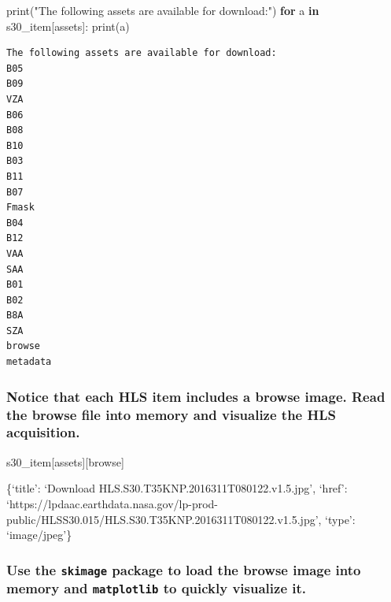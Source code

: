 \documentclass[
  letterpaper,
]{scrartcl}
\newenvironment{Shaded}{}{}
\newcommand{\BuiltInTok}[1]{#1}
\newcommand{\ControlFlowTok}[1]{\textcolor[rgb]{0.00,0.44,0.13}{\textbf{#1}}}
\newcommand{\KeywordTok}[1]{\textcolor[rgb]{0.00,0.44,0.13}{\textbf{#1}}}
\newcommand{\NormalTok}[1]{#1}
\newcommand{\StringTok}[1]{\textcolor[rgb]{0.25,0.44,0.63}{#1}}
\begin{document}
\begin{Shaded}
\begin{Highlighting}[]
\BuiltInTok{print}\NormalTok{(}\StringTok{"The following assets are available for download:"}\NormalTok{)}
\ControlFlowTok{for}\NormalTok{ a }\KeywordTok{in}\NormalTok{ s30\_item[}\StringTok{\textquotesingle{}assets\textquotesingle{}}\NormalTok{]: }\BuiltInTok{print}\NormalTok{(a)}
\end{Highlighting}
\end{Shaded}

\begin{verbatim}
The following assets are available for download:
B05
B09
VZA
B06
B08
B10
B03
B11
B07
Fmask
B04
B12
VAA
SAA
B01
B02
B8A
SZA
browse
metadata
\end{verbatim}

\hypertarget{notice-that-each-hls-item-includes-a-browse-image.-read-the-browse-file-into-memory-and-visualize-the-hls-acquisition.}{%
\subsubsection{Notice that each HLS item includes a browse image. Read
the browse file into memory and visualize the HLS
acquisition.}\label{notice-that-each-hls-item-includes-a-browse-image.-read-the-browse-file-into-memory-and-visualize-the-hls-acquisition.}}

\begin{Shaded}
\begin{Highlighting}[]
\NormalTok{s30\_item[}\StringTok{\textquotesingle{}assets\textquotesingle{}}\NormalTok{][}\StringTok{\textquotesingle{}browse\textquotesingle{}}\NormalTok{]}
\end{Highlighting}
\end{Shaded}

\{`title': `Download HLS.S30.T35KNP.2016311T080122.v1.5.jpg', `href':
`https://lpdaac.earthdata.nasa.gov/lp-prod-public/HLSS30.015/HLS.S30.T35KNP.2016311T080122.v1.5.jpg',
`type': `image/jpeg'\}

\hypertarget{use-the-skimage-package-to-load-the-browse-image-into-memory-and-matplotlib-to-quickly-visualize-it.}{%
\subsubsection{\texorpdfstring{Use the \texttt{skimage} package to load
the browse image into memory and \texttt{matplotlib} to quickly
visualize
it.}{Use the skimage package to load the browse image into memory and matplotlib to quickly visualize it.}}\label{use-the-skimage-package-to-load-the-browse-image-into-memory-and-matplotlib-to-quickly-visualize-it.}}
\end{document}
